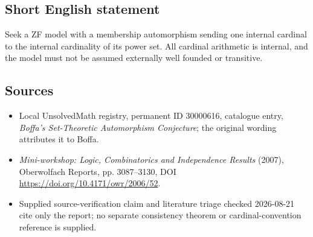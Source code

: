 \documentclass[11pt]{article}
\begin{document}
\subsection{Short English statement}
Seek a ZF model with a membership automorphism sending one internal cardinal to the internal cardinality of its power set. All cardinal arithmetic is internal, and the model must not be assumed externally well founded or transitive.
\subsection{Sources}
\begin{itemize}
\item Local UnsolvedMath registry, permanent ID 30000616, catalogue entry, \emph{Boffa's Set-Theoretic Automorphism Conjecture}; the original wording attributes it to Boffa.
\item \emph{Mini-workshop: Logic, Combinatorics and Independence Results} (2007), Oberwolfach Reports, pp. 3087--3130, DOI \url{https://doi.org/10.4171/owr/2006/52}.
\item Supplied source-verification claim and literature triage checked 2026-08-21 cite only the report; no separate consistency theorem or cardinal-convention reference is supplied.
\end{itemize}
\end{document}
